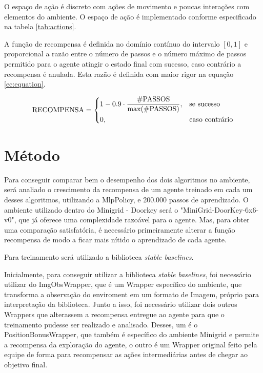 \documentclass[9pt,a4paper,twoside]{tau}
\begin{document}
O espaço de ação é discreto com ações de movimento e poucas interações com elementos do ambiente. O espaço de ação é implementado conforme especificado na tabela \ref{tab:actions}.

A função de recompensa é definida no domínio contínuo do intervalo \([0, 1]\) e proporcional a razão entre o número de passos e o número máximo de passos permitido para o agente atingir o estado final com sucesso, caso contrário a recompensa é anulada. Esta razão é definida com maior rigor na equação \ref{ec:equation}.

\begin{equation}
    \label{ec:equation}
    \text{RECOMPENSA} =
    \begin{dcases}
        1-0.9\cdot\frac{\text{\#PASSOS}}{\text{max(\#PASSOS)}}, & \text{se sucesso}     \\
        0,                                                      & \text{caso contrário}
    \end{dcases}
\end{equation}


\section{Método}


Para conseguir comparar bem o desempenho dos dois algoritmos no ambiente, será analiado o crescimento da recompensa de um agente treinado em cada um desses algoritmos, utilizando a MlpPolicy, e 200.000 passos de aprendizado. O ambiente utilizado dentro do Minigrid - Doorkey será o "MiniGrid-DoorKey-6x6-v0", que já oferece uma complexidade razoável para o agente. Mas, para obter uma comparação satisfatória, é necessário primeiramente alterar a função recompensa de modo a ficar mais nítido o aprendizado de cada agente.

\begin{info}[frametitle=Atenção]
    Para treinamento será utilizado a biblioteca \textit{stable baselines}.
\end{info}

Inicialmente, para conseguir utilizar a biblioteca \textit{stable baselines}, foi necessário utilizar do ImgObsWrapper, que é um Wrapper específico do ambiente, que transforma a observação do enviroment em um formato de Imagem, próprio para interpretação da biblioteca. Junto a isso, foi necessário utilizar dois outros Wrappers que alterassem a recompensa entregue ao agente para que o treinamento pudesse ser realizado e analisado. Desses, um é o PositionBonusWrapper, que também é específico do ambiente Minigrid e permite a recompensa da exploração do agente, o outro é um Wrapper original feito pela equipe de forma para recompensar as ações intermediárias antes de chegar ao objetivo final.
\end{document}
